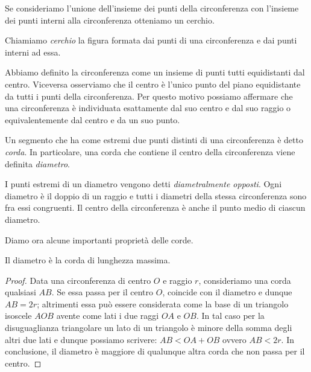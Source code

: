 Se consideriamo l'unione dell'insieme dei punti della circonferenza 
con l'insieme dei punti interni alla circonferenza otteniamo un 
cerchio.

\begin{definizione}
Chiamiamo \emph{cerchio} la figura formata dai punti di una 
circonferenza e dai punti interni ad essa.
\end{definizione}

Abbiamo definito la circonferenza come un insieme di punti tutti 
equidistanti dal centro. Viceversa osserviamo che il centro è l'unico 
punto del piano equidistante da tutti i punti della circonferenza. 
Per questo motivo possiamo affermare che una circonferenza è 
individuata esattamente dal suo centro e dal suo raggio o 
equivalentemente dal centro e da un suo punto.

\begin{definizione}
Un segmento che ha come estremi due punti distinti di una 
circonferenza è detto \emph{corda}. In particolare, una corda che 
contiene il centro della circonferenza viene definita \emph{diametro}.
\end{definizione}

I punti estremi di un diametro vengono detti \emph{diametralmente 
opposti}.
Ogni diametro è il doppio di un raggio e tutti i diametri della 
stessa circonferenza sono fra essi congruenti. Il centro della 
circonferenza è anche il punto medio di ciascun diametro.

Diamo ora alcune importanti proprietà delle corde.

\begin{teorema}
Il diametro è la corda di lunghezza massima.
\end{teorema}

\noindent\begin{minipage}{0.65\textwidth}\parindent15pt
\begin{proof}
Data una circonferenza di centro \(O\) e raggio \(r\), consideriamo una 
corda qualsiasi \(AB\). Se essa passa per il centro \(O\), coincide con 
il diametro e dunque \(AB=2r\); altrimenti essa può essere considerata 
come la base di un triangolo isoscele \(AOB\) avente come lati i due 
raggi \(OA\) e \(OB\). In tal caso per la disuguaglianza triangolare un 
lato di un triangolo è minore della somma degli altri due lati e 
dunque possiamo scrivere: \(AB < OA + OB\) ovvero \(AB < 2r\).
In conclusione, il diametro è maggiore di qualunque altra corda che 
non passa per il centro.
\end{proof}
\end{minipage}\hfil
\begin{minipage}{0.35\textwidth}
  \centering
\end{minipage}

